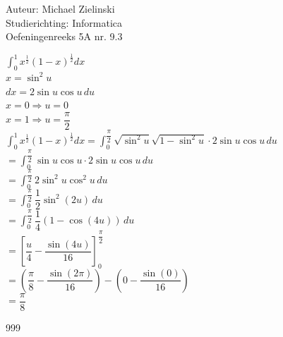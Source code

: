 \documentclass[a4paper]{article}
\begin{document}
  
\noindent \large Auteur: Michael Zielinski \\
\noindent \large Studierichting: Informatica\\
\noindent \large Oefeningenreeks 5A nr. 9.3\\

\medskip

\normalsize

$ \displaystyle\int^1_0 x^{\tfrac{1}{2}}(1-x)^{\tfrac{1}{2}} dx $ \\

$ x = \sin^2 u $ \\

$ dx = 2\sin u \cos u \, du $ \\

$ x = 0 \Rightarrow u = 0 $ \\

$ x = 1 \Rightarrow u = \dfrac{\pi}{2} $ \\

$ \displaystyle\int^1_0 x^{\tfrac{1}{2}}(1-x)^{\tfrac{1}{2}} dx
= \displaystyle\int^{\dfrac{\pi}{2}}_0 \sqrt{\sin^2 u}\sqrt{1-\sin^2 u} \cdot 2\sin u \cos u \, du $ \\

$ = \displaystyle\int^{\dfrac{\pi}{2}}_0 \sin u \cos u \cdot 2\sin u \cos u \, du $ \\

$ = \displaystyle\int^{\dfrac{\pi}{2}}_0 2\sin^2 u \cos^2 u \, du $ \\

$ = \displaystyle\int^{\dfrac{\pi}{2}}_0 \dfrac{1}{2}\sin^2(2u) \, du $ \\

$ = \displaystyle\int^{\dfrac{\pi}{2}}_0 \dfrac{1}{4}(1-\cos(4u)) \, du $ \\

$ = \left[ \dfrac{u}{4} - \dfrac{\sin(4u)}{16} \right]^{\dfrac{\pi}{2}}_0 $ \\

$ = \left( \dfrac{\pi}{8} - \dfrac{\sin(2\pi)}{16} \right) - \left( 0 - \dfrac{\sin(0)}{16} \right) $ \\

$ = \dfrac{\pi}{8} $ \\



\begin{thebibliography}{999}
\end{thebibliography}
\end{document}
